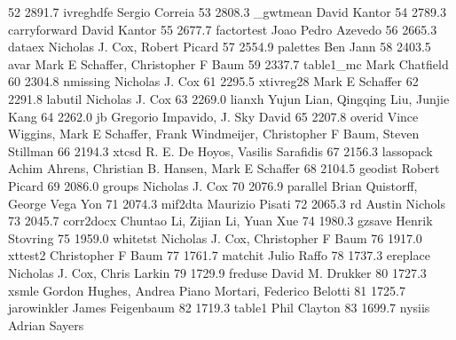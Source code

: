     52   2891.7    ivreghdfe     Sergio Correia                          
    53   2808.3    _gwtmean      David Kantor                            
    54   2789.3    carryforward  David Kantor                            
    55   2677.7    factortest    Joao Pedro Azevedo                      
    56   2665.3    dataex        Nicholas J. Cox, Robert Picard          
    57   2554.9    palettes      Ben Jann                                
    58   2403.5    avar          Mark E Schaffer, Christopher F Baum     
    59   2337.7    table1_mc     Mark Chatfield                          
    60   2304.8    nmissing      Nicholas J. Cox                         
    61   2295.5    xtivreg28     Mark E Schaffer                         
    62   2291.8    labutil       Nicholas J. Cox                         
    63   2269.0    lianxh        Yujun Lian, Qingqing Liu, Junjie Kang   
    64   2262.0    jb            Gregorio Impavido, J. Sky David         
    65   2207.8    overid        Vince Wiggins, Mark E Schaffer, Frank   
                                   Windmeijer, Christopher F Baum, Steven  
                                   Stillman                                
    66   2194.3    xtcsd         R. E. De Hoyos, Vasilis Sarafidis       
    67   2156.3    lassopack     Achim Ahrens, Christian B. Hansen, Mark 
                                   E Schaffer                              
    68   2104.5    geodist       Robert Picard                           
    69   2086.0    groups        Nicholas J. Cox                         
    70   2076.9    parallel      Brian Quistorff, George Vega Yon        
    71   2074.3    mif2dta       Maurizio Pisati                         
    72   2065.3    rd            Austin Nichols                          
    73   2045.7    corr2docx     Chuntao Li, Zijian Li, Yuan Xue         
    74   1980.3    gzsave        Henrik Stovring                         
    75   1959.0    whitetst      Nicholas J. Cox, Christopher F Baum     
    76   1917.0    xttest2       Christopher F Baum                      
    77   1761.7    matchit       Julio Raffo                             
    78   1737.3    ereplace      Nicholas J. Cox, Chris Larkin           
    79   1729.9    freduse       David M. Drukker                        
    80   1727.3    xsmle         Gordon Hughes, Andrea Piano Mortari,    
                                   Federico Belotti                        
    81   1725.7    jarowinkler   James Feigenbaum                        
    82   1719.3    table1        Phil Clayton                            
    83   1699.7    nysiis        Adrian Sayers                           
